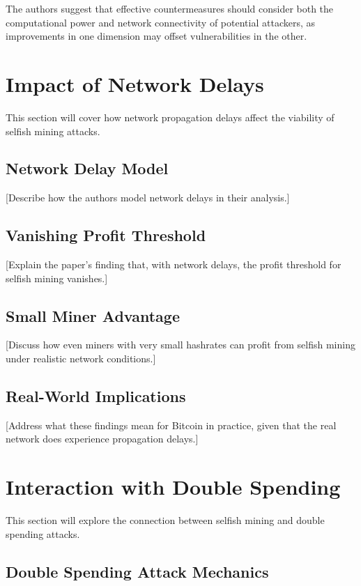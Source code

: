 \documentclass[conference]{IEEEtran}
\begin{document}
The authors suggest that effective countermeasures should consider both the computational power and network connectivity of potential attackers, as improvements in one dimension may offset vulnerabilities in the other.

\section{Impact of Network Delays}

This section will cover how network propagation delays affect the viability of selfish mining attacks.

\subsection{Network Delay Model}

[Describe how the authors model network delays in their analysis.]

\subsection{Vanishing Profit Threshold}

[Explain the paper's finding that, with network delays, the profit threshold for selfish mining vanishes.]

\subsection{Small Miner Advantage}

[Discuss how even miners with very small hashrates can profit from selfish mining under realistic network conditions.]

\subsection{Real-World Implications}

[Address what these findings mean for Bitcoin in practice, given that the real network does experience propagation delays.]

\section{Interaction with Double Spending}

This section will explore the connection between selfish mining and double spending attacks.

\subsection{Double Spending Attack Mechanics}
\end{document}
